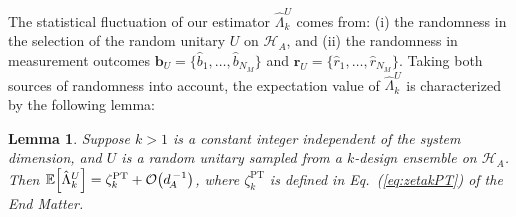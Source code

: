 \documentclass[aps,prl,twocolumn,nofootinbib,superscriptaddress,10pt]{revtex4-2}
\let\originalleft\left
\let\originalright\right
\renewcommand{\left}{\mathopen{}\mathclose\bgroup\originalleft}
\renewcommand{\right}{\aftergroup\egroup\originalright}
\def\E{ {\mathbb E} } %
\newcommand{\bigo}[1]{\mathcal{O}\left(#1\right)}
\theoremstyle{plain}
\newtheorem{lemma}{Lemma}
\theoremstyle{definition}
\newcommand{\PT}{\mathrm{PT}}
\newcommand{\caH}{\mathcal{H}}
\newcommand{\eref}[1]{Eq.~\textup{(\ref{#1})}}
\begin{document}
The statistical fluctuation of our estimator $\hat{\Lambda}_k^{U}$ comes from: 
(i) the randomness in the selection of the random unitary $U$ on $\caH_A$, and 
(ii) the randomness in measurement outcomes $\mathbf{b}_{U} = \big\{\hat{b}_1, \dots, \hat{b}_{N_M}\big\}$ 
and $\mathbf{r}_{U} = \{\hat{r}_1, \dots, \hat{r}_{N_M}\}$. 
Taking both sources of randomness into account, the expectation value of \(\hat{\Lambda}_k^U\) is characterized by the following lemma: 


\begin{lemma}\label{lam:biasLambdaU}
Suppose $k>1$ is a constant integer independent of the system dimension, and $U$ is a random unitary  sampled from a $k$-design ensemble on $\caH_A$. Then 
$\E \left[ \hat{\Lambda}_k^{U} \right]= \zeta_k^{\PT} + \bigo{d_{\!A}^{\,-1}}$, where $\zeta_k^{\PT}$ is defined in \eref{eq:zetakPT} of the End Matter. 
\end{lemma}
\end{document}

